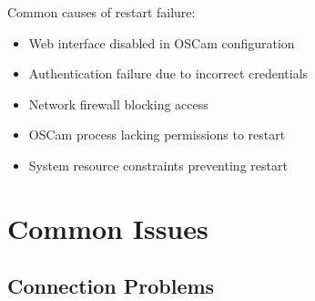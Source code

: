 \documentclass[a4paper,11pt]{report}
\begin{document}
\begin{warningbox}
Common causes of restart failure:
\begin{itemize}
    \item Web interface disabled in OSCam configuration
    \item Authentication failure due to incorrect credentials
    \item Network firewall blocking access
    \item OSCam process lacking permissions to restart
    \item System resource constraints preventing restart
\end{itemize}
\end{warningbox}

\section{Common Issues}

\subsection{Connection Problems}
\end{document}
